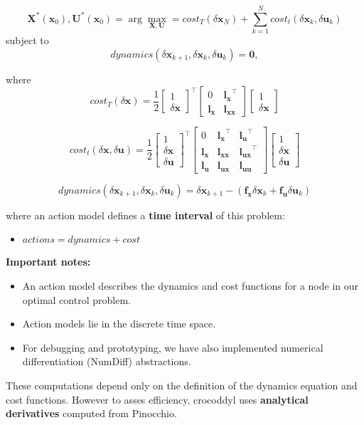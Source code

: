 $$\mathbf{X}^*(\mathbf{x}_0),\mathbf{U}^*(\mathbf{x}_0)
=
\arg\max_{\mathbf{X},\mathbf{U}} = cost_T(\delta\mathbf{x}_N) + \sum_{k=1}^N cost_t(\delta\mathbf{x}_k, \delta\mathbf{u}_k)$$
subject to
$$dynamics(\delta\mathbf{x}_{k+1},\delta\mathbf{x}_k,\delta\mathbf{u}_k)=\mathbf{0},$$

where
$$cost_T(\delta\mathbf{x}) = \frac{1}{2}
\begin{bmatrix} 
  1 \\ \delta\mathbf{x}
\end{bmatrix}^\top
\begin{bmatrix}
0 & \mathbf{l_x}^\top \\
\mathbf{l_x} & \mathbf{l_{xx}}
\end{bmatrix}
\begin{bmatrix}
  1 \\ \delta\mathbf{x}
\end{bmatrix}
$$

$$cost_t(\delta\mathbf{x},\delta\mathbf{u}) = \frac{1}{2}
\begin{bmatrix} 
  1 \\ \delta\mathbf{x} \\ \delta\mathbf{u}
\end{bmatrix}^\top
\begin{bmatrix}
0 & \mathbf{l_x}^\top & \mathbf{l_u}^\top\\
\mathbf{l_x} & \mathbf{l_{xx}} & \mathbf{l_{ux}}^\top\\
\mathbf{l_u} & \mathbf{l_{ux}} & \mathbf{l_{uu}}
\end{bmatrix}
\begin{bmatrix}
  1 \\ \delta\mathbf{x} \\ \delta\mathbf{u}
\end{bmatrix}
$$

$$
dynamics(\delta\mathbf{x}_{k+1},\delta\mathbf{x}_k,\delta\mathbf{u}_k) = \delta\mathbf{x}_{k+1} - (\mathbf{f_x}\delta\mathbf{x}_k + \mathbf{f_u}\delta\mathbf{u}_k)
$$

where an action model defines a \textbf{time interval} of this problem:
\begin{itemize}
\item $actions = dynamics + cost$
\end{itemize}

\textbf{Important notes:}
\begin{itemize}
\item An action model describes the dynamics and cost functions for a node in our optimal control problem.
\item Action models lie in the discrete time space.
\item For debugging and prototyping, we have also implemented numerical differentiation (NumDiff) abstractions.
\end{itemize}
 These computations depend only on the definition of the dynamics equation and cost functions. However to asses efficiency, crocoddyl uses \textbf{analytical derivatives} computed from Pinocchio.
 
